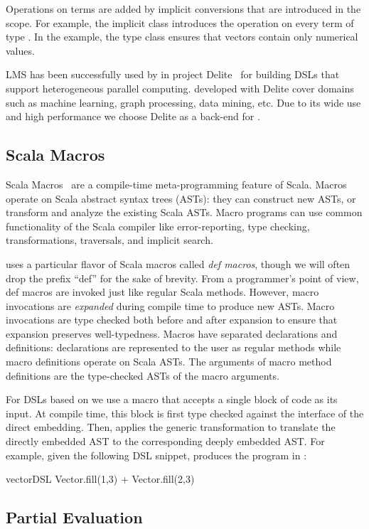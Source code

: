 Operations on  terms are added by implicit conversions that are introduced in the \edsl scope. For example, the implicit class  introduces the \code{+} operation on every term of type . In the example, the type class  ensures that vectors contain only numerical values.

LMS has been successfully used by in project Delite~\cite{brown_heterogeneous_2011,composition-ecoop2013} for building DSLs that support heterogeneous parallel computing. \edsls developed with Delite cover domains
such as machine learning, graph processing, data mining, etc. Due to its wide use and high performance we choose Delite as a back-end for \yy.


\subsection{Scala Macros}
\label{sec:scala-macros}

Scala Macros~\cite{burmako_scala_2013} are a compile-time meta-programming
feature of Scala. Macros operate on Scala abstract syntax trees (ASTs): they
can construct new ASTs, or transform and analyze the existing Scala ASTs.
Macro programs can use common functionality of the Scala compiler like
error-reporting, type checking, transformations, traversals, and implicit
search.

\yy uses a particular flavor of Scala macros called \emph{def
  macros}, though we will often drop the prefix ``def'' for the
sake of brevity.  From a programmer's point of view, def macros
are invoked just like regular Scala methods.  However, macro
invocations are \emph{expanded} during compile time to produce new
ASTs.  Macro invocations are type checked both before and after
expansion to ensure that expansion preserves well-typedness.  Macros
have separated declarations and definitions: declarations are
represented to the user as regular methods while macro definitions
operate on Scala ASTs.  The arguments of macro method definitions are
the type-checked ASTs of the macro arguments.

For DSLs based on \yy we use a macro that accepts a single block of
code as its input. At compile time, this block is first type checked
against the interface of the direct embedding. Then, \yy applies the
generic transformation to translate the directly embedded AST to the
corresponding deeply embedded AST.  For example, given the following
DSL snippet, \yy produces the  program in
:\vspace{3pt}
\begin{listingtiny}
  vectorDSL {
    Vector.fill(1,3) + Vector.fill(2,3)
  }
\end{listingtiny}

\subsection{Partial Evaluation}
\label{sec:partial-evaluation}
